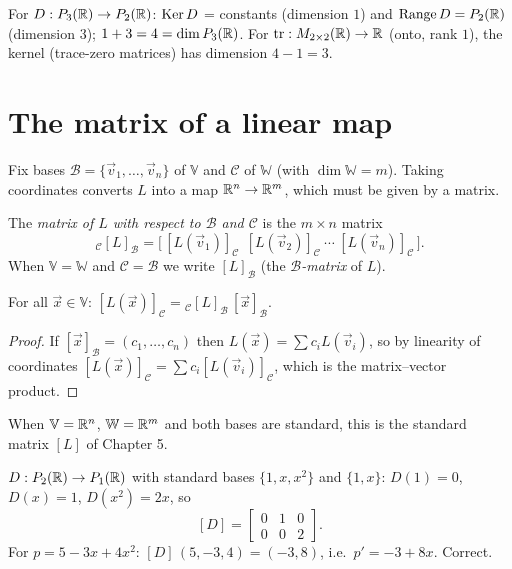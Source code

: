 \begin{example}
For $D:P_{3}(\mathbb{R})\to P_{2}(\mathbb{R})$: $\operatorname{Ker} D$ = constants (dimension $1$) and $\operatorname{Range} D=P_{2}(\mathbb{R})$ (dimension $3$); $1+3=4=\dim P_{3}(\mathbb{R})$.
For $\operatorname{tr}:M_{2\times 2}(\mathbb{R})\to\mathbb{R}$ (onto, rank $1$), the kernel (trace-zero matrices) has dimension $4-1=3$.
\end{example}

\section{The matrix of a linear map}

Fix bases $\mathcal B=\{\vec v_1,\dots,\vec v_n\}$ of $\mathbb V$ and $\mathcal C$ of $\mathbb W$ (with $\dim\mathbb W=m$). Taking
coordinates converts $L$ into a map $\mathbb{R}^n\to\mathbb{R}^m$, which must be given by a matrix.

\begin{definition}
The \emph{matrix of $L$ with respect to $\mathcal B$ and $\mathcal C$} is the $m\times n$ matrix
\[
  {}_{\mathcal C}[L]_{\mathcal B}=\Big[\,[L(\vec v_1)]_{\mathcal C}\ \ [L(\vec v_2)]_{\mathcal C}\ \cdots\ [L(\vec v_n)]_{\mathcal C}\,\Big].
\]
When $\mathbb V=\mathbb W$ and $\mathcal C=\mathcal B$ we write $[L]_{\mathcal B}$ (the \emph{$\mathcal B$-matrix} of $L$).
\end{definition}

\begin{theorem}
For all $\vec x\in\mathbb V$: $[L(\vec x)]_{\mathcal C}={}_{\mathcal C}[L]_{\mathcal B}\,[\vec x]_{\mathcal B}$.
\end{theorem}
\begin{proof}
If $[\vec x]_{\mathcal B}=(c_1,\dots,c_n)$ then $L(\vec x)=\sum c_iL(\vec v_i)$, so by linearity of coordinates
$[L(\vec x)]_{\mathcal C}=\sum c_i[L(\vec v_i)]_{\mathcal C}$, which is the matrix--vector product.
\end{proof}

When $\mathbb V=\mathbb{R}^n$, $\mathbb W=\mathbb{R}^m$ and both bases are standard, this is the standard matrix $[L]$ of Chapter 5.

\begin{example}
$D:P_{2}(\mathbb{R})\to P_{1}(\mathbb{R})$ with standard bases $\{1,x,x^2\}$ and $\{1,x\}$: $D(1)=0$, $D(x)=1$, $D(x^2)=2x$, so
\[
  [D]=\begin{bmatrix}0&1&0\\0&0&2\end{bmatrix}.
\]
For $p=5-3x+4x^2$: $[D]\,(5,-3,4)=(-3,8)$, i.e.\ $p'=-3+8x$. Correct.
\end{example}

